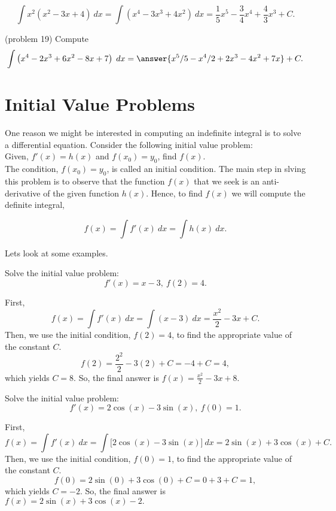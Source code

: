 \documentclass[handout]{ximera}
\begin{document}
\begin{example}[example 19]
\[
\int x^2(x^2 - 3x + 4) \ dx = \int (x^4 - 3x^3 + 4x^2) \ dx = \frac15 x^5 - \frac{3}{4}x^4 + \frac43 x^3 + C.
\]

\end{example}

\begin{problem}(problem 19)
Compute
\[
\int \left(x^4 - 2x^3 + 6x^2 - 8x + 7 \right) \; dx = \answer{ x^5/5 - x^4/2 + 2x^3 - 4x^2 + 7x} + C.
\]
\end{problem}





\section{Initial Value Problems}


One reason we might be interested in computing an indefinite integral is to solve a differential equation. Consider the following initial value problem:\\
Given, $f'(x) = h(x)$ and $f(x_0) = y_0$, find $f(x)$.\\
The condition, $f(x_0) = y_0$, is called an initial condition. The main step in slving this problem is to observe that the function $f(x)$ that we seek is an anti-derivative of the given function $h(x)$. Hence, to find $f(x)$ we will compute the definite integral, 

\[f(x) = \int f'(x) \ dx = \int h(x) \ dx.\]

Lets look at some examples.

\begin{example}[example 20]
Solve the initial value problem:
\[f'(x) = x - 3, \ f(2) = 4.\]

First, 
\[f(x) = \int f'(x) \ dx = \int (x-3)  \ dx = \frac{x^2}{2} - 3x + C.\]
Then, we use the initial condition, $f(2) = 4$, to find the 
appropriate value of the constant $C$.
\[f(2) = \frac{2^2}{2} - 3(2) + C = -4 + C = 4,\]
which yields $C = 8$.
So, the final answer is  $f(x) = \frac{x^2}{2} -3x + 8.$
\end{example}

\begin{example}[example 21]
Solve the initial value problem:
\[f'(x) = 2\cos(x) -3\sin(x), \ f(0) = 1.\]

First, 
\[f(x) = \int f'(x) \ dx = \int \big[2\cos(x) -3\sin(x)\big]  \ dx =
 2\sin(x) + 3\cos(x) + C.\]
Then, we use the initial condition, $f(0) = 1$, to find the 
appropriate value of the constant $C$.
\[f(0) = 2\sin(0) + 3\cos(0) + C = 0 + 3 + C = 1,\]
which yields $C = -2$.
So, the final answer is  $f(x) = 2\sin(x) + 3\cos(x)-2.$
\end{example}
\end{document}

